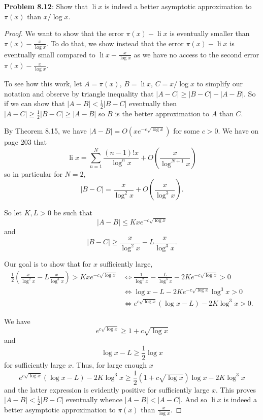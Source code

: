 \documentclass[12pt]{article}
\DeclareMathOperator{\li}{li}
\renewcommand{\O}[1]{O\left( #1 \right)}
\begin{document}
\fi

\textbf{Problem 8.12}: Show that $\li x$ is indeed a better asymptotic approximation to $\pi(x)$ than $x/\log x$.

\begin{proof}
We want to show that the error $\pi(x) - \li x$ is eventually smaller than $\pi(x) - \frac{x}{\log x}$. To do that, we show instead that the error $\pi(x) - \li x$ is eventually small compared to $\li x - \frac{x}{\log x}$ as we have no access to the second error $\pi(x) - \frac{x}{\log x}$.

To see how this work, let $A = \pi(x)$, $B = \li x$, $C = x/\log x$ to simplify our notation and observe by triangle inequality that $|A - C| \geq |B - C| - |A - B|$. So if we can show that $|A - B| < \frac{1}{2} |B - C|$ eventually then $|A - C| \geq \frac12 |B - C| \geq |A - B|$ so $B$ is the better approximation to $A$ than $C$.

By Theorem 8.15, we have $|A - B| = O(x e^{-c\sqrt{\log x}})$ for some $c > 0$. We have on page 203 that
$$\li x = \sum_{n = 1}^{N} \frac{(n-1)! x}{\log^n x} + \O{\frac{x}{\log^{N + 1} x}}$$
so in particular for $N = 2$,
$$|B - C| = \frac{x}{\log^2 x} + \O{\frac{x}{\log^3 x}}.$$

So let $K, L > 0$ be such that
$$|A - B| \leq K x e^{-c\sqrt{\log x}}$$
and
$$|B - C| \geq \frac{x}{\log^2 x} - L \frac{x}{\log^3 x}.$$

Our goal is to show that for $x$ sufficiently large,
\begin{align*}
\frac{1}{2} \left( \frac{x}{\log^2 x} - L \frac{x}{\log^3 x} \right) > K x e^{-c\sqrt{\log x}} &\iff \frac{1}{\log^2 x} - \frac{L}{\log^3 x} - 2 K e^{-c\sqrt{\log x}} > 0\\
&\iff \log x - L - 2 K e^{-c\sqrt{\log x}} \log^3 x  > 0\\
&\iff e^{c\sqrt{\log x}} (\log x - L) - 2 K \log^3 x  > 0.
\end{align*}

We have
$$e^{c\sqrt{\log x}} \geq 1 + c \sqrt{\log x}$$
and
$$\log x - L \geq \frac{1}{2} \log x$$
for sufficiently large $x$. Thus, for large enough $x$
$$e^{c\sqrt{\log x}} (\log x - L) - 2 K \log^3 x \geq \frac{1}{2} (1 + c \sqrt{\log x}) \log x - 2 K \log^3 x$$
and the latter expression is evidently positive for sufficiently large $x$. This proves $|A - B| < \frac{1}{2} |B - C|$ eventually whence $|A - B| < |A - C|$. And so $\li x$ is indeed a better asymptotic approximation to $\pi(x)$ than $\frac{x}{\log x}$.
\end{proof}
\end{document}
